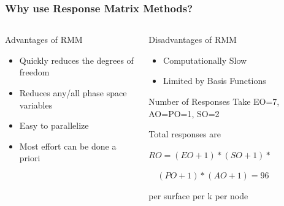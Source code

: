 \documentclass[fleqn]{beamer}
\begin{document}
  \begin{frame}
      \frametitle{Why use Response Matrix Methods?}
      \begin{columns}[T]
          \begin{column}{0.5\textwidth}
              \begin{block}{Advantages of RMM}
                  \begin{itemize}
                      \item Quickly reduces the degrees of freedom
                      \item Reduces any/all phase space variables
                      \item Easy to parallelize
                      \item Most effort can be done a priori
                  \end{itemize}
              \end{block}
          \end{column}
          \begin{column}{0.5\textwidth}
              \begin{block}{Disadvantages of RMM}
                  \begin{itemize}
                      \item Computationally Slow
                      \item Limited by Basis Functions
                  \end{itemize}
              \end{block}
              \begin{block}{Number of Responses}
                  Take EO=7, AO=PO=1, SO=2
                  
                  Total responses are
                  
                  $RO = (EO+1)*(SO+1)*$
                  
                  $\quad (PO+1)*(AO+1) = 96$
                  
                  per surface per k per node
                  
              \end{block}
          \end{column}
      \end{columns}
  \end{frame}
  
\end{document}
